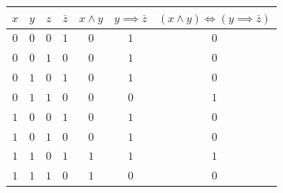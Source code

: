 \documentclass[12pt,a4paper]{article}
\theoremstyle{plain}
\theoremstyle{definition}
\theoremstyle{remark}
\numberwithin{equation}{section}
\begin{document}
\begin{figure}[H]
  \begin{minipage}[t]{0.55\linewidth}
    \vspace{0em}
    \begin{tabularx}{\textwidth}{|c|c|c|c|c|c|C|}
      \hline
      $x$ & $y$ & $z$ & $\overline{z}$ & $x \land y$ & $y \implies \overline{z}$ & $(x \land y) \iff (y \implies \overline{z})$ \\
      \hline
      $0$ & $0$ & $0$ & $1$ & $0$ & $1$ & $0$ \\
      $0$ & $0$ & $1$ & $0$ & $0$ & $1$ & $0$ \\  
      $0$ & $1$ & $0$ & $1$ & $0$ & $1$ & $0$ \\
      $0$ & $1$ & $1$ & $0$ & $0$ & $0$ & $1$ \\
      $1$ & $0$ & $0$ & $1$ & $0$ & $1$ & $0$ \\
      $1$ & $0$ & $1$ & $0$ & $0$ & $1$ & $0$ \\
      $1$ & $1$ & $0$ & $1$ & $1$ & $1$ & $1$ \\
      $1$ & $1$ & $1$ & $0$ & $1$ & $0$ & $0$ \\
      \hline  
    \end{tabularx}


\end{minipage}
\end{figure}
\end{document}
